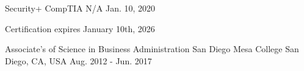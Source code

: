 

\begin{cventries}

	\cventry
	{Security+}
	{CompTIA}
	{N/A}
	{Jan. 10, 2020}
	{
		\begin{cvitems} %
			\item {Certification expires January 10th, 2026}
		\end{cvitems}
	}

	\cventry
	{Associate's of Science in Business Administration}
	{San Diego Mesa College}
	{San Diego, CA, USA}
	{Aug. 2012 - Jun. 2017}
	{}

\end{cventries}
